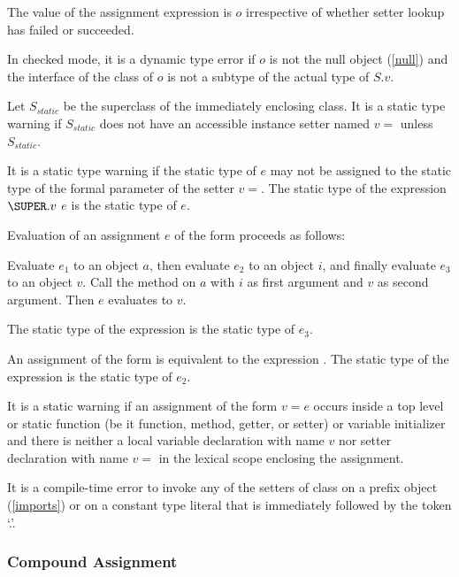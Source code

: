 \documentclass{article}
\begin{document}
\LMHash{}
The value of the assignment expression is $o$ irrespective of whether setter lookup has failed or succeeded.

\LMHash{}
In checked mode, it is a dynamic type error if $o$ is not the null object (\ref{null}) and the interface of the class of $o$ is not a subtype of the actual type of $S.v$.

\LMHash{}
Let $S_{static}$ be the superclass of the immediately enclosing class.
It is a static type warning if $S_{static}$ does not have an accessible instance setter named $v=$ unless $S_{static}$.

\LMHash{}
It is a static type warning if the static type of $e$ may not be assigned to the static type of the formal parameter of the setter $v=$.
The static type of the expression $\SUPER.v$ \code{=} $e$ is the static type of $e$.

\LMHash{}
Evaluation of an assignment $e$ of the form 
proceeds as follows:

\LMHash{}
Evaluate $e_1$ to an object $a$, then evaluate $e_2$ to an object $i$, and finally evaluate $e_3$ to an object $v$.
Call the method \code{[]=} on $a$ with $i$ as first argument and $v$ as second argument.
Then $e$ evaluates to $v$.

\LMHash{}
The static type of the expression  is the static type of $e_3$.

\LMHash{}
An assignment of the form  is equivalent to the expression .
The static type of the expression  is the static type of $e_2$.


\LMHash{}
It is a static warning if an assignment of the form $v = e$ occurs inside a top level or static function (be it function, method, getter, or setter) or variable initializer and there is neither a local variable declaration with name $v$ nor setter declaration with name $v=$ in the lexical scope enclosing the assignment.

\LMHash{}
It is a compile-time error to invoke any of the setters of class  on a prefix object (\ref{imports}) or on a constant type literal that is immediately followed by the token `.'.


\subsubsection{Compound Assignment}
\end{document}
